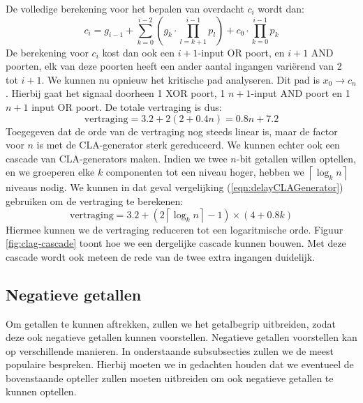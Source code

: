 De volledige berekening voor het bepalen van overdacht $c_i$ wordt dan:
\begin{equation}
c_i=g_{i-1}+\displaystyle\sum_{k=0}^{i-2}{\left(g_k\cdot\displaystyle\prod_{l=k+1}^{i-1}{p_l}\right)}+c_0\cdot\displaystyle\prod_{k=0}^{i-1}{p_k}
\end{equation}
De berekening voor $c_i$ kost dan ook een $i+1$-input OR poort, en $i+1$ AND poorten, elk van deze poorten heeft een ander aantal ingangen vari\"erend van 2 tot $i+1$. We kunnen nu opnieuw het kritische pad analyseren. Dit pad is $x_0\rightarrow c_n$. Hierbij gaat het signaal doorheen 1 XOR poort, 1 $n+1$-input AND poort en 1 $n+1$ input OR poort. De totale vertraging is dus:
\begin{equation}
\mbox{vertraging}=3.2+2\left(2+0.4n\right)=0.8n+7.2
\label{eqn:delayCLAGenerator}
\end{equation}
Toegegeven dat de orde van de vertraging nog steeds linear is, maar de factor voor $n$ is met de CLA-generator sterk gereduceerd. We kunnen echter ook een cascade van CLA-generators maken. Indien we twee $n$-bit getallen willen optellen, en we groeperen elke $k$ componenten tot een niveau hoger, hebben we $\left\lceil\log_kn\right\rceil$ niveaus nodig. We kunnen in dat geval vergelijking (\ref{eqn:delayCLAGenerator}) gebruiken om de vertraging te berekenen:
\begin{equation}
\mbox{vertraging}=3.2+\left(2\left\lceil\log_kn\right\rceil-1\right)\times\left(4+0.8k\right)
\end{equation}
Hiermee kunnen we de vertraging reduceren tot een logaritmische orde. Figuur \ref{fig:clag-cascade} toont hoe we een dergelijke cascade kunnen bouwen. Met deze cascade wordt ook meteen de rede van de twee extra ingangen duidelijk.
\subsection{Negatieve getallen}
Om getallen te kunnen aftrekken, zullen we het getalbegrip uitbreiden, zodat deze ook negatieve getallen kunnen voorstellen. Negatieve getallen voorstellen kan op verschillende manieren. In onderstaande subsubsecties zullen we de meest populaire bespreken. Hierbij moeten we in gedachten houden dat we eventueel de bovenstaande opteller zullen moeten uitbreiden om ook negatieve getallen te kunnen optellen.
